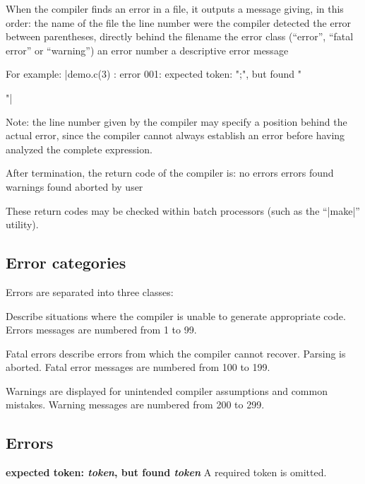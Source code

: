 When the compiler finds an error in a file, it outputs a message giving, in
this order:
\beginlist{1em} \compactlist
\list{\lbullet} the name of the file
\list{\lbullet} the line number were the compiler detected the error between
  parentheses, directly behind the filename
\list{\lbullet} the error class (``error'', ``fatal error'' or ``warning'')
\list{\lbullet} an error number
\list{\lbullet} a descriptive error message
\endlist

For example: \lbreak
\tabto 35pt  |demo.c(3) : error 001: expected token: ";", but found "{"|

Note: the line number given by the compiler may specify a position behind the
actual error, since the compiler cannot always establish an error before
having analyzed the complete expression.

After termination, the return code of the compiler is:
\beginlist{20pt}\compactlist
{} no errors
 errors found
 warnings found
 aborted by user
\endlist

These return codes may be checked within batch processors (such as the ``|make|''
utility).

\subsection{Error categories}
Errors are separated into three classes:

\beginlist{70pt}
 Describe situations where the compiler is unable to generate
  appropriate code. Errors messages are numbered from 1 to 99.

 Fatal errors describe errors from which the compiler
  cannot recover. Parsing is aborted. Fatal error messages are numbered from
  100 to 199.

 Warnings are displayed for unintended compiler assumptions and
  common mistakes. Warning messages are numbered from 200 to 299.
\endlist


\subsection{Errors}

\def\boldline#1{{\bf #1}\lbreak}

\beginlist{40pt}
 \boldline{expected token: {\it token\/}, but found {\it token}}
        A required token is omitted.

}
